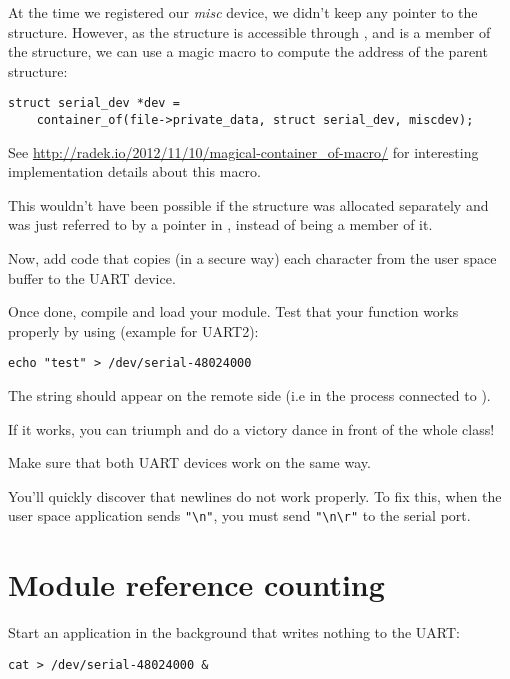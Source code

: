 At the time we registered our {\em misc} device, we didn't keep any
pointer to the  structure. However, as the
 structure is accessible through
, and is a member of the
 structure, we can use a magic macro to compute
the address of the parent structure:

\begin{verbatim}
struct serial_dev *dev =
	container_of(file->private_data, struct serial_dev, miscdev);
\end{verbatim}

See \url{http://radek.io/2012/11/10/magical-container_of-macro/}
for interesting implementation details about this macro.

This wouldn't have been possible if the  structure
was allocated separately and was just referred to by a pointer in
, instead of being a member of it.

Now, add code that copies (in a secure way) each character from the
user space buffer to the UART device.

Once done, compile and load your module. Test that your  function
works properly by using (example for UART2):

\begin{verbatim}
echo "test" > /dev/serial-48024000
\end{verbatim}

The  string should appear on the remote side (i.e in
the  process connected to ).

If it works, you can triumph and do a victory dance in front of the
whole class!

Make sure that both UART devices work on the same way.

You'll quickly discover that newlines do not work properly. To fix
this, when the user space application sends \verb+"\n"+, you must send
\verb+"\n\r"+ to the serial port.

\section{Module reference counting}

Start an application in the background that writes nothing to the
UART:

\begin{verbatim}
cat > /dev/serial-48024000 &
\end{verbatim}

